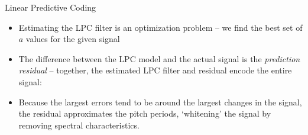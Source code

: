 \documentclass{beamer}
\begin{document}
\begin{frame}
Linear Predictive Coding
\begin{itemize}
\item{Estimating the LPC filter is an optimization problem -- we find the best set of $a$ values for the given signal}
\item{The difference between the LPC model and the actual signal is the \textit{prediction residual} -- together, the estimated LPC filter and residual encode the entire signal:}
\end{itemize}
\begin{itemize}
\item{Because the largest errors tend to be around the largest changes in the signal, the residual approximates the pitch periods, `whitening' the signal by removing spectral characteristics.}
\end{itemize}
\end{frame}
\end{document}
